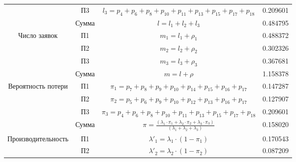 \begin{adjustbox}{max width=\textwidth}
\begin{tabular}{|c|c|c|c|}
                                    & П3     & $l_3 = p_4+p_6+p_8+p_{10}+p_{11}+p_{13}+p_{15}+p_{17}+p_{18}$                                                 & 0.209601  \\ \cline{2-4}
                                    & Сумма  & $l = l_1+l_2+l_3$                                                                                             & 0.484795  \\ \hline
\multirow{4}{*}{Число заявок}       & П1     & $m_1 = l_1+\rho_1$                                                                                            & 0.488372  \\ \cline{2-4}
                                    & П2     & $m_2 = l_2+\rho_2$                                                                                            & 0.302326  \\ \cline{2-4}
                                    & П3     & $m_3 = l_3+\rho_3$                                                                                            & 0.367681  \\ \cline{2-4}
                                    & Сумма  & $m = l+\rho$                                                                                                  & 1.158378  \\ \hline
\multirow{4}{*}{Вероятность потери} & П1     & $\pi_1 = p_7+p_8+p_9+p_{10}+p_{14}+p_{15}+p_{16}+p_{17}$                                                      & 0.147287  \\ \cline{2-4}
                                    & П2     & $\pi_2 = p_5+p_6+p_9+p_{10}+p_{12}+p_{13}+p_{16}+p_{17}$                                                      & 0.127907  \\ \cline{2-4}
                                    & П3     & $\pi_3 = p_4+p_6+p_8+p_{10}+p_{11}+p_{13}+p_{15}+p_{17}+p_{18}$                                               & 0.209601  \\ \cline{2-4}
                                    & Сумма  & $\pi = \frac{(\lambda_1\cdot\pi_1+\lambda_2\cdot\pi_2+\lambda_3\cdot\pi_3)}{(\lambda_1+\lambda_2+\lambda_3)}$ & 0.158020  \\ \hline
\multirow{4}{*}{Производительность} & П1     & $\lambda'_1 = \lambda_1\cdot (1-\pi_1)$                                                                       & 0.170543  \\ \cline{2-4}
                                    & П2     & $\lambda'_2 = \lambda_2\cdot (1-\pi_2)$                                                                       & 0.087209  \\ \cline{2-4}

\end{tabular}
\end{adjustbox}
